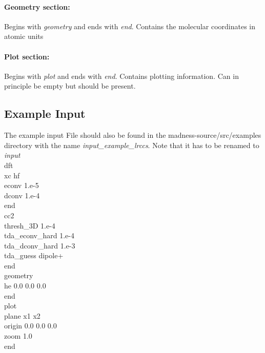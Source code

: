 \documentclass[10pt,a4paper]{scrartcl}
\begin{document}
\paragraph{Geometry section:} Begins with \textit{geometry} and ends with \textit{end}. Contains the molecular coordinates in atomic units
\paragraph{Plot section:} Begins with \textit{plot} and ends with \textit{end}. Contains plotting information. Can in principle be empty but should be present. 
\subsection{Example Input}
The example input File should also be found in the madness-source/src/examples directory with the name \textit{input\_example\_lrccs}. Note that it has to be renamed to \textit{input}\\


dft\\
  xc hf\\
  econv 1.e-5\\
  dconv 1.e-4\\
end\\

cc2\\
  thresh\_3D 1.e-4\\
  tda\_econv\_hard 1.e-4\\
  tda\_dconv\_hard 1.e-3\\
  tda\_guess dipole+ \\
end\\

geometry\\
	he 0.0 0.0 0.0\\
end\\

plot \\
 plane x1 x2\\
 origin 0.0 0.0 0.0\\
 zoom 1.0\\
end



\end{document}
